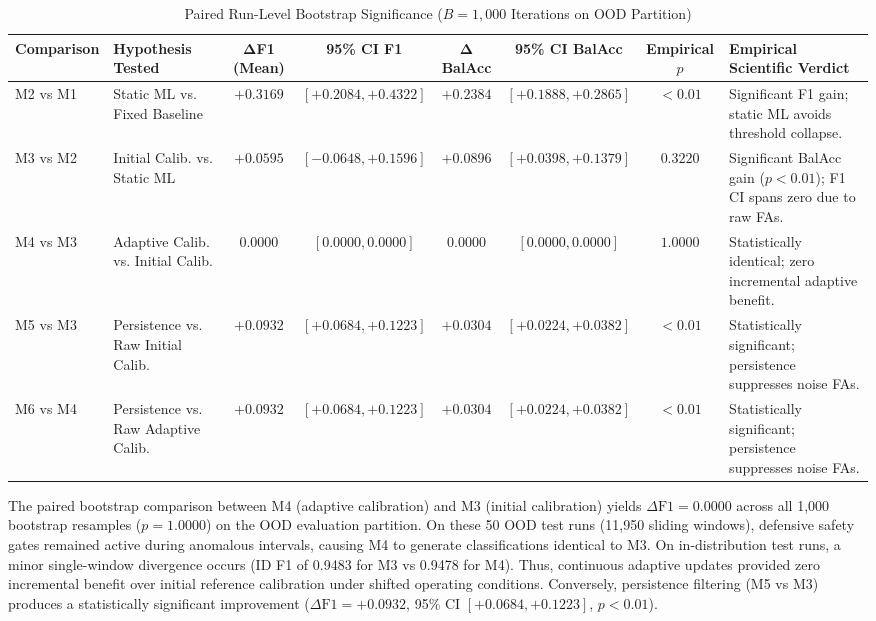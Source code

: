 \documentclass[conference]{IEEEtran}
\begin{document}
\begin{table}[!t]
\caption{Paired Run-Level Bootstrap Significance ($B=1,000$ Iterations on OOD Partition)}
\label{tab:bootstrap}
\centering
\begingroup
\footnotesize
\setlength{\tabcolsep}{3.5pt}
\begin{tabularx}{\textwidth}{@{}lp{3.2cm}ccccc>{\raggedright\arraybackslash}X@{}}
\toprule
\textbf{Comparison} & \textbf{Hypothesis Tested} & $\mathbf{\Delta}$\textbf{F1 (Mean)} & \textbf{95\% CI F1} & $\mathbf{\Delta}$\textbf{BalAcc} & \textbf{95\% CI BalAcc} & \textbf{Empirical} $p$ & \textbf{Empirical Scientific Verdict} \\
\midrule
M2 vs M1 & Static ML vs. Fixed Baseline & $+0.3169$ & $[+0.2084, +0.4322]$ & $+0.2384$ & $[+0.1888, +0.2865]$ & $< 0.01$ & Significant F1 gain; static ML avoids threshold collapse. \\
M3 vs M2 & Initial Calib. vs. Static ML & $+0.0595$ & $[-0.0648, +0.1596]$ & $+0.0896$ & $[+0.0398, +0.1379]$ & $0.3220$ & Significant BalAcc gain ($p<0.01$); F1 CI spans zero due to raw FAs. \\
M4 vs M3 & Adaptive Calib. vs. Initial Calib. & $0.0000$ & $[0.0000, 0.0000]$ & $0.0000$ & $[0.0000, 0.0000]$ & $1.0000$ & Statistically identical; zero incremental adaptive benefit. \\
M5 vs M3 & Persistence vs. Raw Initial Calib. & $+0.0932$ & $[+0.0684, +0.1223]$ & $+0.0304$ & $[+0.0224, +0.0382]$ & $< 0.01$ & Statistically significant; persistence suppresses noise FAs. \\
M6 vs M4 & Persistence vs. Raw Adaptive Calib. & $+0.0932$ & $[+0.0684, +0.1223]$ & $+0.0304$ & $[+0.0224, +0.0382]$ & $< 0.01$ & Statistically significant; persistence suppresses noise FAs. \\
\bottomrule
\end{tabularx}
\endgroup
\end{table}

The paired bootstrap comparison between M4 (adaptive calibration) and M3 (initial calibration) yields $\Delta\text{F1} = 0.0000$ across all 1,000 bootstrap resamples ($p = 1.0000$) on the OOD evaluation partition. On these 50 OOD test runs (11,950 sliding windows), defensive safety gates remained active during anomalous intervals, causing M4 to generate classifications identical to M3. On in-distribution test runs, a minor single-window divergence occurs (ID F1 of 0.9483 for M3 vs 0.9478 for M4). Thus, continuous adaptive updates provided zero incremental benefit over initial reference calibration under shifted operating conditions. Conversely, persistence filtering (M5 vs M3) produces a statistically significant improvement ($\Delta\text{F1} = +0.0932$, 95\% CI $[+0.0684, +0.1223]$, $p < 0.01$).
\end{document}
